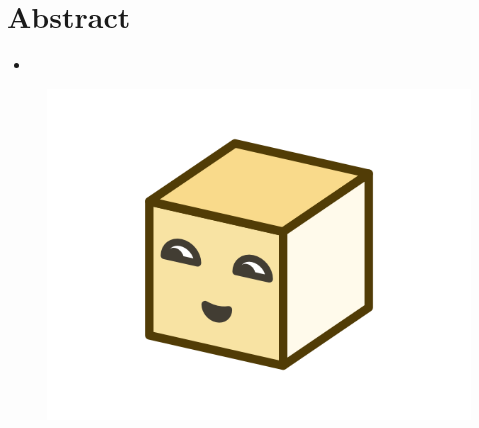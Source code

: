 \chapter*{Abstract}

\begin{itemize}
  \item {}
\end{itemize}


\begin{figure}[ht]
  \centering
  \includegraphics[width=0.4\linewidth]{assets/illustration-microservice-2.png}
\end{figure}
